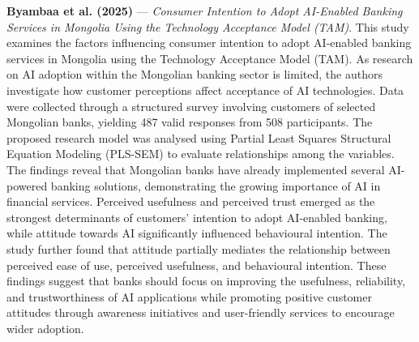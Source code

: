 \documentclass[conference]{IEEEtran}
\begin{document}
\noindent\textbf{Byambaa et al. (2025)}\nocite{Ikhsan2025} --- \emph{Consumer Intention to Adopt AI-Enabled Banking Services in Mongolia Using the Technology Acceptance Model (TAM)}. This study examines the factors influencing consumer intention to adopt AI-enabled banking services in Mongolia using the Technology Acceptance Model (TAM). As research on AI adoption within the Mongolian banking sector is limited, the authors investigate how customer perceptions affect acceptance of AI technologies. Data were collected through a structured survey involving customers of selected Mongolian banks, yielding 487 valid responses from 508 participants. The proposed research model was analysed using Partial Least Squares Structural Equation Modeling (PLS-SEM) to evaluate relationships among the variables. The findings reveal that Mongolian banks have already implemented several AI-powered banking solutions, demonstrating the growing importance of AI in financial services. Perceived usefulness and perceived trust emerged as the strongest determinants of customers' intention to adopt AI-enabled banking, while attitude towards AI significantly influenced behavioural intention. The study further found that attitude partially mediates the relationship between perceived ease of use, perceived usefulness, and behavioural intention. These findings suggest that banks should focus on improving the usefulness, reliability, and trustworthiness of AI applications while promoting positive customer attitudes through awareness initiatives and user-friendly services to encourage wider adoption.

\par\medskip
\end{document}
